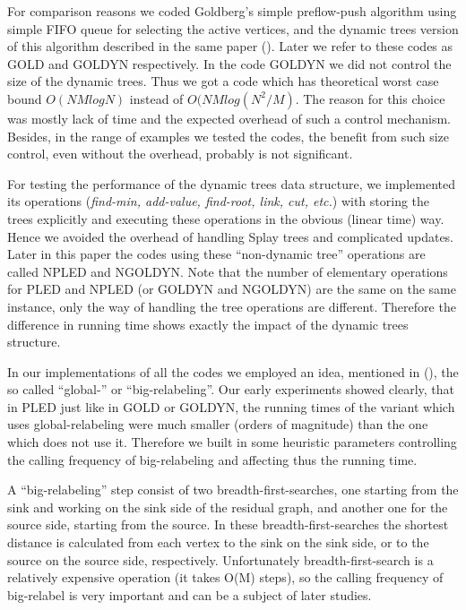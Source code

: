 For comparison reasons we coded Goldberg's simple preflow-push
algorithm using simple FIFO queue for selecting the active vertices,
and the dynamic trees version of this algorithm
described in the same paper (\cite{GT88}). Later we refer to these
codes as GOLD and GOLDYN respectively. 
In the code GOLDYN we did not control the size of the dynamic trees.
Thus we got a code which has theoretical worst case bound
$O(NMlogN)$ instead of $O(NMlog(N^2/M)$. The reason for this choice
was mostly lack of time and the expected overhead of such a control
mechanism. Besides, in the range of examples we tested the codes,
the benefit from such size control, even without the overhead,
probably is not significant.

For testing the performance of the dynamic trees data structure, we 
implemented its operations ({\sl find-min, add-value, find-root,
link, cut, etc.}) with storing the trees explicitly and executing these
operations in the obvious (linear time) way. Hence we avoided the
overhead of handling Splay trees and complicated updates. Later in
this paper the codes using these ``non-dynamic tree'' operations are
called NPLED and NGOLDYN. Note that the number of elementary
operations for PLED and NPLED (or GOLDYN and NGOLDYN) are the same
on the same instance, only the way of handling the tree operations are
different. Therefore the difference in running time shows exactly the
impact of the dynamic trees structure.
 

In our implementations of all the codes we employed an idea,
mentioned in (\cite{GT88}), 
the so called ``global-'' or ``big-relabeling''. Our early experiments
showed clearly, that in PLED just like in GOLD or GOLDYN, the running
times of the variant which uses 
global-relabeling were much smaller (orders of magnitude) than the one
which does not use it. Therefore we built in some heuristic parameters
controlling the calling frequency of big-relabeling and affecting thus
the running time. 
  
A ``big-relabeling'' step consist of two breadth-first-searches, one
starting from the sink and working on the sink side of the residual
graph, and another one for the source side, starting from the source. 
In these breadth-first-searches the shortest distance is calculated
from each vertex to the sink on the sink side, 
or to the source on the source side, respectively.
Unfortunately breadth-first-search is a relatively expensive operation
(it takes O(M) steps), so the calling frequency of big-relabel is very
important and can be a subject of later studies.  



